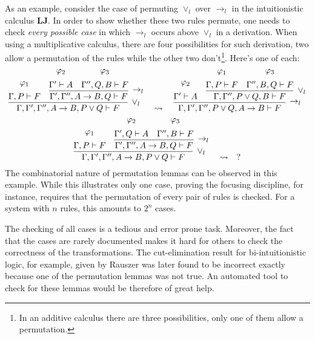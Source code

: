 \documentclass{llncs}
\begin{document}
As an example, consider the case of permuting $\vee_l$ over $\rightarrow_l$ in
the intuitionistic calculus \textbf{LJ}. In order to show whether these two
rules permute, one needs to check \emph{every possible case} in which
$\rightarrow_l$ occurs above $\vee_l$ in a derivation. When using a
multiplicative calculus, there are four possibilities for such derivation, two
allow a permutation of the rules while the other two don't\footnote{In an
additive calculus there are three possibilities, only one of them allow a
permutation.}. Here's one of each:
{\scriptsize
\[
\infer[\vee_l]{\Gamma, \Gamma', \Gamma'', A \rightarrow B , P \vee Q \vdash F}{
  \deduce{\Gamma, P \vdash F}{\varphi_1\vspace{0.2cm}}
  &
  \infer[\rightarrow_l]{\Gamma', \Gamma'', A \rightarrow B , Q \vdash F}{
    \deduce{\Gamma' \vdash A}{\varphi_2\vspace{0.2cm}}
    &
    \deduce{\Gamma'', Q, B \vdash F}{\varphi_3\vspace{0.2cm}}
  }
}
\quad\rightsquigarrow\quad
\infer[\rightarrow_l]{\Gamma, \Gamma', \Gamma'', P \vee Q, A \rightarrow B
\vdash F}{
  \deduce{\Gamma' \vdash A}{\varphi_2\vspace{0.2cm}}
  &
  \infer[\vee_l]{\Gamma, \Gamma'', P \vee Q, B \vdash F}{
    \deduce{\Gamma, P \vdash F}{\varphi_1\vspace{0.2cm}}
    &
    \deduce{\Gamma'', B, Q \vdash F}{\varphi_3\vspace{0.2cm}}
  }
}
\]
}
{\scriptsize
\[
\infer[\vee_l]{\Gamma, \Gamma', \Gamma'', A \rightarrow B , P \vee Q \vdash F}{
  \deduce{\Gamma, P \vdash F}{\varphi_1\vspace{0.2cm}}
  &
  \infer[\rightarrow_l]{\Gamma', \Gamma'', A \rightarrow B , Q \vdash F}{
    \deduce{\Gamma', Q \vdash A}{\varphi_2\vspace{0.2cm}}
    &
    \deduce{\Gamma'', B \vdash F}{\varphi_3\vspace{0.2cm}}
  }
}
\quad\rightsquigarrow\quad
?
\]
}
%
The combinatorial nature of permutation lemmas can be observed in this example.
While this illustrates only one case, proving the focusing discipline, for
instance, requires that the permutation of every pair of rules is checked. For a
system with $n$ rules, this amounts to $2^n$ cases.

The checking of all cases is a tedious and error prone task. Moreover, the
fact that the cases are rarely documented makes it hard for others to check the
correctness of the transformations. The cut-elimination result for
bi-intuitionistic logic, for example, given by Rauszer \cite{rauszer74studia}
was later found to be incorrect \cite{crolard01tcs} exactly because one of the
permutation lemmas was not true. An automated tool to check for these lemmas
would be therefore of great help.
\end{document}
